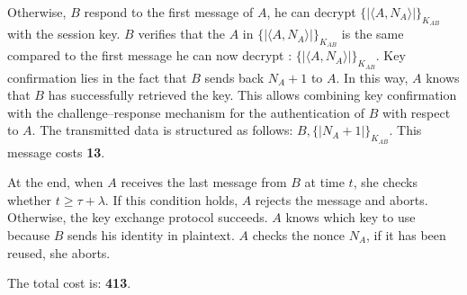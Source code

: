 Otherwise, $B$ respond to the first message of $A$, he can decrypt $\{| \langle A, N_A \rangle |\}_{K_{AB}}$ with the session key.
$B$ verifies that the $A$ in $\{| \langle A, N_A \rangle |\}_{K_{AB}}$ is the same compared to the first message he can now decrypt : $\{| \langle A,N_A \rangle |\}_{K_{AB}}$.
Key confirmation lies in the fact that $B$ sends back $N_A + 1$ to $A$. In this way, $A$ knows that $B$ has successfully
retrieved the key. This allows combining key confirmation with the challenge–response mechanism for the authentication
of $B$ with respect to $A$. The transmitted data is structured as follows: $B, \{| N_A + 1|\}_{K_{AB}}$.
This message costs \textbf{13}.

\vspace{1cm}


At the end, when $A$ receives the last message from $B$ at time $t$, she checks whether $t \geq \tau + \lambda$. If
this condition holds, $A$ rejects the message and aborts. Otherwise, the key exchange protocol succeeds.
$A$ knows which key to use because $B$ sends his identity in plaintext. $A$ checks the nonce $N_A$, if it has been reused, she aborts.
\vspace{1cm}

The total cost is: \textbf{413}.
